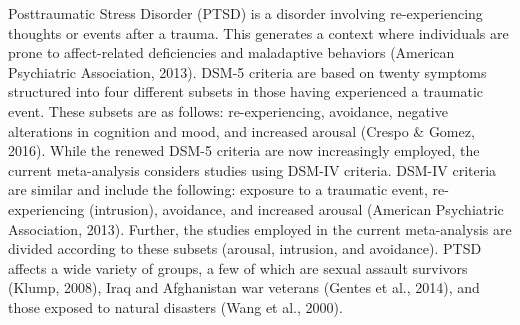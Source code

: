 \documentclass[man, mask]{apa6}
\theoremstyle{definition}
\theoremstyle{definition}
\theoremstyle{definition}
\theoremstyle{remark}
\begin{document}
Posttraumatic Stress Disorder (PTSD) is a disorder involving
re-experiencing thoughts or events after a trauma. This generates a
context where individuals are prone to affect-related deficiencies and
maladaptive behaviors (American Psychiatric Association, 2013). DSM-5
criteria are based on twenty symptoms structured into four different
subsets in those having experienced a traumatic event. These subsets are
as follows: re-experiencing, avoidance, negative alterations in
cognition and mood, and increased arousal (Crespo \& Gomez, 2016). While
the renewed DSM-5 criteria are now increasingly employed, the current
meta-analysis considers studies using DSM-IV criteria. DSM-IV criteria
are similar and include the following: exposure to a traumatic event,
re-experiencing (intrusion), avoidance, and increased arousal (American
Psychiatric Association, 2013). Further, the studies employed in the
current meta-analysis are divided according to these subsets (arousal,
intrusion, and avoidance). PTSD affects a wide variety of groups, a few
of which are sexual assault survivors (Klump, 2008), Iraq and
Afghanistan war veterans (Gentes et al., 2014), and those exposed to
natural disasters (Wang et al., 2000).
\end{document}

